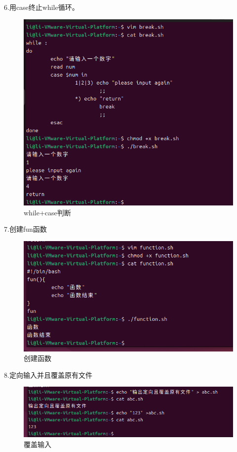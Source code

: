 \documentclass[a4paper, 12pt]{article}
\begin{document}
6.用case终止while循环。
\begin{figure}[H]
  \centering
  \includegraphics[width=1\textwidth]{屏幕截图 2024-09-01 210447.png}
  \caption{while+case判断}
    \end{figure}
\newpage
7.创建fun函数
\begin{figure}[H]
  \centering
  \includegraphics[width=1\textwidth]{屏幕截图 2024-09-01 233555.png}
  \caption{创建函数}
    \end{figure}

8.定向输入并且覆盖原有文件
\begin{figure}[H]
  \centering
  \includegraphics[width=1\textwidth]{屏幕截图 2024-09-01 233829.png}
  \caption{覆盖输入}
    \end{figure}
\end{document}
